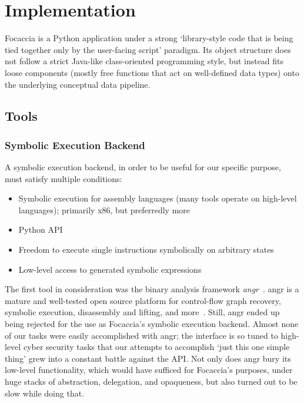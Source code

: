 \chapter{Implementation}\label{chapter:implementation}

Focaccia is a Python application under a strong `library-style code that is being tied together only by the user-facing
script' paradigm. Its object structure does not follow a strict Java-like class-oriented programming style, but instead
fits loose components (mostly free functions that act on well-defined data types) onto the underlying conceptual data
pipeline.

\section{Tools}

\subsection{Symbolic Execution Backend}

A symbolic execution backend, in order to be useful for our specific purpose, must satisfy multiple conditions:

\begin{itemize}
    \item Symbolic execution for assembly languages (many tools operate on high-level languages); primarily x86, but
        preferredly more
    \item Python API
    \item Freedom to execute single instructions symbolically on arbitrary states
    \item Low-level access to generated symbolic expressions
\end{itemize}

The first tool in consideration was the binary analysis framework \textit{angr}~\cite{shoshitaishvili2016state}. angr is
a mature and well-tested open source platform for control-flow graph recovery, symbolic execution, disassembly and
lifting, and more~\cite{AngrWebsite2024Mar}. Still, angr ended up being rejected for the use as Focaccia's symbolic
execution backend. Almost none of our tasks were easily accomplished with angr; the interface is so tuned to high-level
cyber security tasks that our attempts to accomplish `just this one simple thing' grew into a constant battle against
the API\@. Not only does angr bury its low-level functionality, which would have sufficed for Focaccia's purposes, under
huge stacks of abstraction, delegation, and opaqueness, but also turned out to be slow while doing that.

